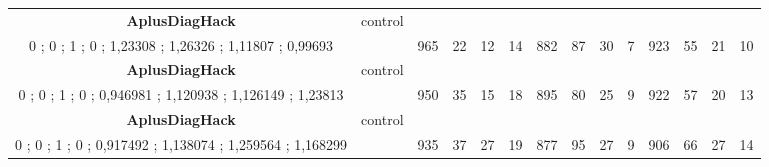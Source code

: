 \begin{table}[]
{\begin{tabular}{|c|c|c|c|c|c|c|c|c|c|c|c|c|c|}
\cellcolor{blue!15}\textbf{AplusDiagHack} & control& {\color[HTML]{00009B} } & {\color[HTML]{9A0000} } & {\color[HTML]{009901} } &  & {\color[HTML]{00009B} } & {\color[HTML]{9A0000} } & {\color[HTML]{009901} } &  & {\color[HTML]{00009B} } & {\color[HTML]{9A0000} } & {\color[HTML]{009901} } &  \\ 
\cellcolor{ blue!15}0 ; 0 ; 1 ; 0 ; 1,23308 ; 1,26326 ; 1,11807 ; 0,99693 &  & \multirow{-2}{*}{{\color[HTML]{00009B} 965}} & \multirow{-2}{*}{{\color[HTML]{9A0000} 22}} & \multirow{-2}{*}{{\color[HTML]{009901} 12}} & \multirow{-2}{*}{14} & \multirow{-2}{*}{{\color[HTML]{00009B} 882}} & \multirow{-2}{*}{{\color[HTML]{9A0000} 87}} & \multirow{-2}{*}{{\color[HTML]{009901} 30}} & \multirow{-2}{*}{7} & \multirow{-2}{*}{{\color[HTML]{00009B} 923}} & \multirow{-2}{*}{{\color[HTML]{9A0000} 55}} & \multirow{-2}{*}{{\color[HTML]{009901} 21}} & \multirow{-2}{*}{10} \\ \hline

\cellcolor{blue!15}\textbf{AplusDiagHack} & control& {\color[HTML]{00009B} } & {\color[HTML]{9A0000} } & {\color[HTML]{009901} } &  & {\color[HTML]{00009B} } & {\color[HTML]{9A0000} } & {\color[HTML]{009901} } &  & {\color[HTML]{00009B} } & {\color[HTML]{9A0000} } & {\color[HTML]{009901} } &  \\ 
\cellcolor{ blue!15}0 ; 0 ; 1 ; 0 ; 0,946981 ; 1,120938 ; 1,126149 ; 1,23813 &  & \multirow{-2}{*}{{\color[HTML]{00009B} 950}} & \multirow{-2}{*}{{\color[HTML]{9A0000} 35}} & \multirow{-2}{*}{{\color[HTML]{009901} 15}} & \multirow{-2}{*}{18} & \multirow{-2}{*}{{\color[HTML]{00009B} 895}} & \multirow{-2}{*}{{\color[HTML]{9A0000} 80}} & \multirow{-2}{*}{{\color[HTML]{009901} 25}} & \multirow{-2}{*}{9} & \multirow{-2}{*}{{\color[HTML]{00009B} 922}} & \multirow{-2}{*}{{\color[HTML]{9A0000} 57}} & \multirow{-2}{*}{{\color[HTML]{009901} 20}} & \multirow{-2}{*}{13} \\ \hline

\cellcolor{blue!15}\textbf{AplusDiagHack} & control& {\color[HTML]{00009B} } & {\color[HTML]{9A0000} } & {\color[HTML]{009901} } &  & {\color[HTML]{00009B} } & {\color[HTML]{9A0000} } & {\color[HTML]{009901} } &  & {\color[HTML]{00009B} } & {\color[HTML]{9A0000} } & {\color[HTML]{009901} } &  \\ 
\cellcolor{ blue!15}0 ; 0 ; 1 ; 0 ; 0,917492 ; 1,138074 ; 1,259564 ; 1,168299 &  & \multirow{-2}{*}{{\color[HTML]{00009B} 935}} & \multirow{-2}{*}{{\color[HTML]{9A0000} 37}} & \multirow{-2}{*}{{\color[HTML]{009901} 27}} & \multirow{-2}{*}{19} & \multirow{-2}{*}{{\color[HTML]{00009B} 877}} & \multirow{-2}{*}{{\color[HTML]{9A0000} 95}} & \multirow{-2}{*}{{\color[HTML]{009901} 27}} & \multirow{-2}{*}{9} & \multirow{-2}{*}{{\color[HTML]{00009B} 906}} & \multirow{-2}{*}{{\color[HTML]{9A0000} 66}} & \multirow{-2}{*}{{\color[HTML]{009901} 27}} & \multirow{-2}{*}{14} \\ \hline


\end{tabular}}
\end{table}
